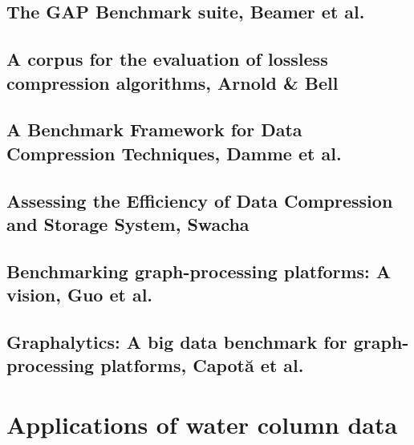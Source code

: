 	\subsection{The GAP Benchmark suite, Beamer et al.}    
	\subsection{A corpus for the evaluation of lossless compression algorithms, Arnold \& Bell}	    
	\subsection{A Benchmark Framework for Data Compression Techniques, Damme et al.}
		
    \subsection{Assessing the Efficiency of Data Compression and Storage System, Swacha}
		
        
\subsection{Benchmarking graph-processing platforms: A vision, Guo et al.}

\subsection{Graphalytics: A big data benchmark for graph-processing platforms, Capot{\u{a}} et al.}
	
        
\section{Applications of water column data}
